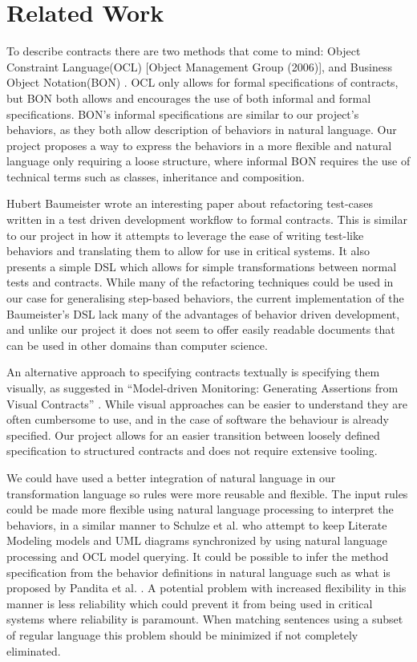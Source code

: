 \section{Related Work}
To describe contracts there are two methods that come to mind: Object Constraint Language(OCL) [Object Management Group (2006)], and Business Object Notation(BON) \cite{walden1995}.
OCL only allows for formal specifications of contracts, but BON both allows and encourages the use of both informal and formal specifications.
BON's informal specifications are similar to our project's behaviors, as they both allow description of behaviors in natural language.
Our project proposes a way to express the behaviors in a more flexible and natural language only requiring a loose structure, where informal BON requires the use of technical terms such as classes, inheritance and composition.



Hubert Baumeister wrote an interesting paper \cite{baumeister2004} about refactoring test-cases written in a test driven development workflow to formal contracts.
This is similar to our project in how it attempts to leverage the ease of writing test-like behaviors and translating them to allow for use in critical systems.
It also presents a simple DSL which allows for simple transformations between normal tests and contracts.
While many of the refactoring techniques could be used in our case for generalising step-based behaviors, the current implementation of the Baumeister’s DSL lack many of the advantages of behavior driven development, and unlike our project it does not seem to offer easily readable documents that can be used in other domains than computer science.



An alternative approach to specifying contracts textually is specifying them visually, as suggested in ``Model-driven Monitoring: Generating Assertions from Visual Contracts'' \cite{lohmann2006}. While visual approaches can be easier to understand they are often cumbersome to use, and in the case of software the behaviour is already specified.
Our project allows for an easier transition between loosely defined specification to structured contracts and does not require extensive tooling.



We could have used a better integration of natural language in our transformation language so rules were more reusable and flexible. 
The input rules could be made more flexible using natural language processing to interpret the behaviors, in a similar manner to Schulze et al. \cite{schulze2012} who attempt to keep Literate Modeling models and UML diagrams synchronized by using natural language processing and OCL model querying.
It could be possible to infer the method specification from the behavior definitions in natural language such as what is proposed by Pandita et al. \cite{pandita2012}.
A potential problem with increased flexibility in this manner is less reliability which could prevent it from being used in critical systems where reliability is paramount.
When matching sentences using a subset of regular language this problem should be minimized if not completely eliminated.